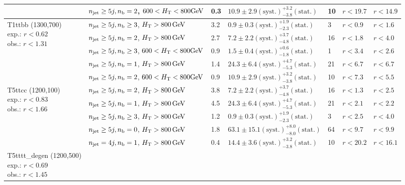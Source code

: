 \begin{table}[h!]
\begin{tabular}{ lllllll }
 & $n_{\mathrm{jet}} \geq5j,n_{\text{b}} =2$, $600 < \mbox{$H_\text{T}$} < 800 \mathrm{GeV}$ & 0.3 & $10.9 \pm 2.9 \mathrm{(syst.)} ^{+3.2}_{-3.8} \mathrm{(stat.)}$ & 10 & $r < 19.7$ & $r < 14.9$\\ \hline
\multirow{5}{*}{\parbox[t]{2cm}{T1ttbb (1300,700)\\exp.: $r<0.62$\\obs.: $r<1.31$}}
 & $n_{\mathrm{jet}} \geq5j,n_{\text{b}} \geq3$, $\mbox{$H_\text{T}$} > 800 \, \mathrm{GeV}$ & 3.2 & $0.9 \pm 0.3 \mathrm{(syst.)} ^{+1.9}_{-2.3} \mathrm{(stat.)}$ & 3 & $r < 0.9$ & $r < 1.6$\\ 
 & $n_{\mathrm{jet}} \geq5j,n_{\text{b}} =2$, $\mbox{$H_\text{T}$} > 800 \, \mathrm{GeV}$ & 2.7 & $7.2 \pm 2.2 \mathrm{(syst.)} ^{+3.7}_{-4.8} \mathrm{(stat.)}$ & 16 & $r < 1.8$ & $r < 4.0$\\ 
 & $n_{\mathrm{jet}} \geq5j,n_{\text{b}} \geq3$, $600 < \mbox{$H_\text{T}$} < 800 \mathrm{GeV}$ & 0.9 & $1.5 \pm 0.4 \mathrm{(syst.)} ^{+0.6}_{-1.8} \mathrm{(stat.)}$ & 1 & $r < 3.4$ & $r < 2.6$\\ 
 & $n_{\mathrm{jet}} \geq5j,n_{\text{b}} =1$, $\mbox{$H_\text{T}$} > 800 \, \mathrm{GeV}$ & 1.4 & $24.3 \pm 6.4 \mathrm{(syst.)} ^{+4.7}_{-5.3} \mathrm{(stat.)}$ & 21 & $r < 6.7$ & $r < 6.7$\\ 
 & $n_{\mathrm{jet}} \geq5j,n_{\text{b}} =2$, $600 < \mbox{$H_\text{T}$} < 800 \mathrm{GeV}$ & 0.9 & $10.9 \pm 2.9 \mathrm{(syst.)} ^{+3.2}_{-3.8} \mathrm{(stat.)}$ & 10 & $r < 7.3$ & $r < 5.5$\\ \hline
\multirow{5}{*}{\parbox[t]{2cm}{T5ttcc (1200,100)\\exp.: $r<0.83$\\obs.: $r<1.66$}}
 & $n_{\mathrm{jet}} \geq5j,n_{\text{b}} =2$, $\mbox{$H_\text{T}$} > 800 \, \mathrm{GeV}$ & 3.8 & $7.2 \pm 2.2 \mathrm{(syst.)} ^{+3.7}_{-4.8} \mathrm{(stat.)}$ & 16 & $r < 1.3$ & $r < 2.5$\\ 
 & $n_{\mathrm{jet}} \geq5j,n_{\text{b}} =1$, $\mbox{$H_\text{T}$} > 800 \, \mathrm{GeV}$ & 4.5 & $24.3 \pm 6.4 \mathrm{(syst.)} ^{+4.7}_{-5.3} \mathrm{(stat.)}$ & 21 & $r < 2.1$ & $r < 2.2$\\ 
 & $n_{\mathrm{jet}} \geq5j,n_{\text{b}} \geq3$, $\mbox{$H_\text{T}$} > 800 \, \mathrm{GeV}$ & 1.2 & $0.9 \pm 0.3 \mathrm{(syst.)} ^{+1.9}_{-2.3} \mathrm{(stat.)}$ & 3 & $r < 2.5$ & $r < 4.0$\\ 
 & $n_{\mathrm{jet}} \geq5j,n_{\text{b}} =0$, $\mbox{$H_\text{T}$} > 800 \, \mathrm{GeV}$ & 1.8 & $63.1 \pm 15.1 \mathrm{(syst.)} ^{+8.0}_{-8.0} \mathrm{(stat.)}$ & 64 & $r < 9.7$ & $r < 9.9$\\ 
 & $n_{\mathrm{jet}} =4j,n_{\text{b}} =1$, $\mbox{$H_\text{T}$} > 800 \, \mathrm{GeV}$ & 0.4 & $14.4 \pm 3.6 \mathrm{(syst.)} ^{+3.2}_{-3.8} \mathrm{(stat.)}$ & 10 & $r < 20.2$ & $r < 16.1$\\ \hline
\multirow{5}{*}{\parbox[t]{2cm}{T5tttt\_degen (1200,500)\\exp.: $r<0.69$\\obs.: $r<1.45$}}

\end{tabular}
\end{table}
